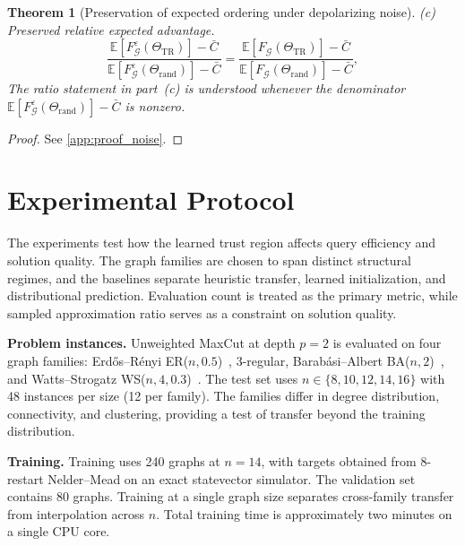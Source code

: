 \documentclass[aps,prx,reprint,superscriptaddress,longbibliography]{revtex4-2}
\newcommand{\calG}{\mathcal{G}}
\newcommand{\bbE}{\mathbb{E}}
\newtheorem{theorem}{Theorem}
\begin{document}
\begin{theorem}[Preservation of expected ordering under depolarizing noise]
\emph{(c) Preserved relative expected advantage.}
\begin{equation}
    \frac{\bbE[F_\calG^\varepsilon(\Theta_{\mathrm{TR}})]
    - \bar{C}}{\bbE[F_\calG^\varepsilon(\Theta_{\mathrm{rand}})]
    - \bar{C}}
    = \frac{\bbE[F_\calG(\Theta_{\mathrm{TR}})]
    - \bar{C}}{\bbE[F_\calG(\Theta_{\mathrm{rand}})]
    - \bar{C}},
    \label{eq:noise_amplify}
\end{equation}
The ratio statement in part~(c) is understood whenever the denominator
$\bbE[F_\calG^\varepsilon(\Theta_{\mathrm{rand}})]-\bar C$ is nonzero.
\end{theorem}

\begin{proof}
See \cref{app:proof_noise}.
\end{proof}

\section{Experimental Protocol}
\label{sec:setup}

The experiments test how the learned trust region affects query efficiency and
solution quality. The graph families are chosen to
span distinct structural regimes, and the baselines separate heuristic
transfer, learned initialization, and distributional prediction.
Evaluation count is treated as the primary metric, while sampled
approximation ratio serves as a constraint on solution quality.

\textbf{Problem instances.}
Unweighted MaxCut at depth $p{=}2$ is evaluated on four graph families:
Erd\H{o}s--R\'enyi ER($n,0.5$)~\cite{erdos1959}, 3-regular,
Barab\'asi--Albert BA($n,2$)~\cite{barabasi1999}, and
Watts--Strogatz WS($n,4,0.3$)~\cite{watts1998}.
The test set uses $n \in \{8,10,12,14,16\}$ with 48 instances per size
(12 per family). The families differ in degree distribution,
connectivity, and clustering, providing a test of transfer beyond the
training distribution.

\textbf{Training.}
Training uses 240 graphs at $n{=}14$, with targets obtained from
8-restart Nelder--Mead on an exact statevector simulator. The validation
set contains 80 graphs. Training at a single graph size separates
cross-family transfer from interpolation across $n$. Total training time
is approximately two minutes on a single CPU core.
\end{document}
